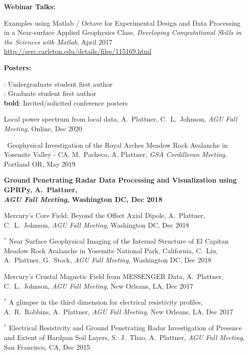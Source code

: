 \documentclass[10pt]{article}
\begin{document}
\clearpage
\textbf{\tsize Webinar Talks:}

\spcp
Examples using Matlab / Octave for Experimental Design and Data Processing in a Near-surface Applied Geophysics Class, 
\emph{Developing Computational Skills in the Sciences with Matlab}, April 2017\\
\url{http://serc.carleton.edu/details/files/115169.html}




\spc
\textbf{\tsize Posters:}

\spcp
\ug: Undergraduate student first author\\
\gr: Graduate student first author\\
\textbf{bold}: Invited/solicited conference posters

\spcp
Local power spectrum from local data,
A.~Plattner, C.~L.~Johnson, 
\emph{AGU Fall Meeting}, Online, Dec 2020 

\spcp
\hspace*{-0.4cm} \gr \, Geophysical Investigation of the Royal Arches Meadow Rock
Avalanche in Yosemite Valley - CA,
M.~Pacheco, A. Plattner,
\emph{GSA Cordilleran Meeting}, Portland OR, May 2019

\spcp
\textbf{Ground Penetrating Radar Data Processing and Visualization using
GPRPy,
A.~Plattner,\\
\emph{AGU Fall Meeting}, Washington DC, Dec 2018}

\spcp
Mercury's Core Field: Beyond the Offset Axial Dipole,
A.~Plattner, C.~L.~Johnson, 
\emph{AGU Fall Meeting}, Washington DC, Dec 2018 

\spcp
\hspace{-0.4cm} $^*$ Near Surface Geophysical Imaging of the Internal
Structure of El Capitan Meadow Rock Avalanche in Yosemite National
Park, California,
C.~Liu, A.~Plattner, G.~Stock,
\emph{AGU Fall Meeting}, Washington DC, Dec 2018


\spcp
Mercury's Crustal Magnetic Field from MESSENGER Data,
 A.~Plattner, C.~L.~Johnson, 
\emph{AGU Fall Meeting}, New Orleans, LA, Dec 2017 

\spcp
\hspace{-0.4cm} $^*$ A glimpse in the third dimension for electrical
resistivity profiles,
A.~R.~Robbins, A.~Plattner,
\emph{AGU Fall Meeting}, New Orleans, LA, Dec 2017 

\spcp
\hspace{-0.4cm} $^*$ Electrical Resistivity and Ground Penetrating Radar 
Investigation of Presence and Extent of Hardpan Soil Layers,
 S.~J.~Thao, A.~Plattner,
\emph{AGU Fall Meeting}, San Francisco, CA, Dec 2015
\end{document}
